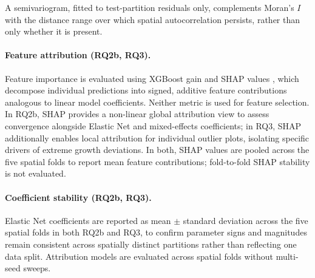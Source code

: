 {A semivariogram, fitted to test-partition residuals only, complements Moran's $I$ with the distance range over which spatial autocorrelation persists, rather than only whether it is present.

\paragraph*{Feature attribution (RQ2b, RQ3).}
Feature importance is evaluated using XGBoost gain and SHAP values \citep{lundberg2017unified}, which decompose individual predictions into signed, additive feature contributions analogous to linear model coefficients. Neither metric is used for feature selection. In RQ2b, SHAP provides a non-linear global attribution view to assess convergence alongside Elastic Net and mixed-effects coefficients; in RQ3, SHAP additionally enables local attribution for individual outlier plots, isolating specific drivers of extreme growth deviations. In both, SHAP values are pooled across the five spatial folds to report mean feature contributions; fold-to-fold SHAP stability is not evaluated.

\paragraph*{Coefficient stability (RQ2b, RQ3).}
Elastic Net coefficients are reported as mean $\pm$ standard deviation across the five spatial folds in both RQ2b and RQ3, to confirm parameter signs and magnitudes remain consistent across spatially distinct partitions rather than reflecting one data split. Attribution models are evaluated across spatial folds without multi-seed sweeps.

}

